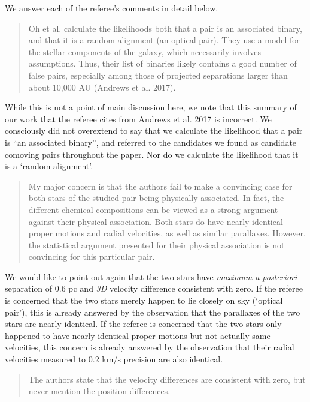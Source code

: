 \documentclass[12pt]{article}
\begin{document}
We answer each of {\sf the referee's comments} in detail below.

\begin{quote}
Oh et al. calculate the likelihoods both that a pair is an associated
binary, and that it is a random alignment (an optical pair). They use a
model for the stellar components of the galaxy, which necessarily
involves assumptions. Thus, their list of binaries likely contains a
good number of false pairs, especially among those of projected
separations larger than about 10,000 AU (Andrews et al. 2017).
\end{quote}

While this is not a point of main discussion here, we note that this
summary of our work that the referee cites from Andrews et al. 2017 is
incorrect. We consciously did not overextend to say that we calculate
the likelihood that a pair is ``an associated binary'', and referred to
the candidates we found as candidate comoving pairs throughout the paper.
Nor do we calculate the likelihood that it is a `random alignment'.

\begin{quote}
My major concern is that the authors fail to make a convincing case for
both stars of the studied pair being physically associated. In fact, the
different chemical compositions can be viewed as a strong argument
against their physical association. Both stars do have nearly identical
proper motions and radial velocities, as well as similar parallaxes.
However, the statistical argument presented for their physical
association is not convincing for this particular pair.
\end{quote}

We would like to point out again that the two stars have \emph{maximum a
posteriori} separation of 0.6 pc and \emph{3D} velocity difference
consistent with zero. If the referee is concerned that the two stars
merely happen to lie closely on sky (`optical pair'), this is already
answered by the observation that the parallaxes of the two stars are
nearly identical. If the referee is concerned that the two stars only
happened to have nearly identical proper motions but not actually same
velocities, this concern is already answered by the observation that
their radial velocities measured to 0.2 km/s precision are also
identical.

\begin{quote}
The authors state that the velocity differences are consistent with
zero, but never mention the position differences.
\end{quote}
\end{document}
